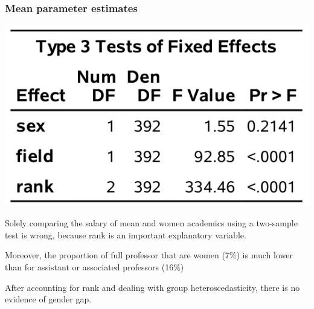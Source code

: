 \documentclass{beamer}
\begin{document}
\begin{frame}
 \frametitle{Mean parameter estimates}
 \begin{center}
  \includegraphics[width = 0.45\linewidth]{img/c5/slides6-e27}  
 \end{center}

 \bi \item 
 Solely comparing the salary of mean and women academics using a two-sample test is wrong, because rank is an important explanatory variable.
 \item  Moreover, the proportion of full professor that are women (7\%) is much lower than for assistant or associated professors (16\%)
 \item After accounting for rank and dealing with group heteroscedasticity, there is no evidence of gender gap.
 \ei
\end{frame}
\end{document}
